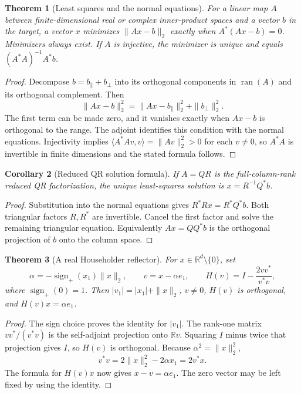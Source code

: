 \documentclass[11pt,oneside,openany]{book}
\theoremstyle{plain}
\newtheorem{theorem}{Theorem}[chapter]
\newtheorem{corollary}[theorem]{Corollary}
\theoremstyle{definition}
\theoremstyle{remark}
\begin{document}
\begin{theorem}[Least squares and the normal equations]
\label{p206:W28}
For a linear map \(A\) between finite-dimensional real or complex
inner-product spaces and a vector \(b\) in the target, a vector \(x\)
minimizes \(\|Ax-b\|_2\) exactly when \(A^*(Ax-b)=0\).
Minimizers always exist. If \(A\) is injective, the minimizer
is unique and equals \((A^*A)^{-1}A^*b\).
\end{theorem}

\begin{proof}
Decompose \(b=b_{\parallel}+b_\perp\) into its orthogonal
components in \(\operatorname{ran}(A)\) and its orthogonal
complement. Then
\[
      \|Ax-b\|_2^2=\|Ax-b_{\parallel}\|_2^2+\|b_\perp\|_2^2 .
\]
The first term can be made zero, and it vanishes exactly when
\(Ax-b\) is orthogonal to the range. The adjoint identifies
this condition with the normal equations. Injectivity implies
\(\langle A^*Av,v\rangle=\|Av\|_2^2>0\) for each \(v\ne0\),
so \(A^*A\) is invertible in finite dimensions and the
stated formula follows.
\end{proof}

\begin{corollary}[Reduced QR solution formula]\label{p206:W29}
If \(A=QR\) is the full-column-rank reduced QR factorization, the
unique least-squares solution is \(x=R^{-1}Q^*b\).
\end{corollary}

\begin{proof}
Substitution into the normal equations gives
\(R^*Rx=R^*Q^*b\). Both triangular factors \(R,R^*\) are
invertible. Cancel the first factor and solve the remaining
triangular equation. Equivalently \(Ax=QQ^*b\) is the
orthogonal projection of \(b\) onto the column space.
\end{proof}

\begin{theorem}[A real Householder reflector]\label{p206:W30}
For \(x\in\mathbb R^d\setminus\{0\}\), set
\[
 \alpha=-\operatorname{sign}_{+}(x_1)\|x\|_2,\qquad
 v=x-\alpha e_1,\qquad
 H(v)=I-\frac{2vv^*}{v^*v},
\]
where \(\operatorname{sign}_{+}(0)=1\). Then
\(|v_1|=|x_1|+\|x\|_2\), \(v\ne0\), \(H(v)\) is orthogonal,
and \(H(v)x=\alpha e_1\).
\end{theorem}

\begin{proof}
The sign choice proves the identity for \(|v_1|\). The rank-one
matrix \(vv^*/(v^*v)\) is the self-adjoint projection onto
\(\mathbb Rv\). Squaring \(I\) minus twice that projection
gives \(I\), so \(H(v)\) is orthogonal. Because
\(\alpha^2=\|x\|_2^2\),
\[
     v^*v=2\|x\|_2^2-2\alpha x_1=2v^*x .
\]
The formula for \(H(v)x\) now gives \(x-v=\alpha e_1\).
The zero vector may be left fixed by using the identity.
\end{proof}
\end{document}

